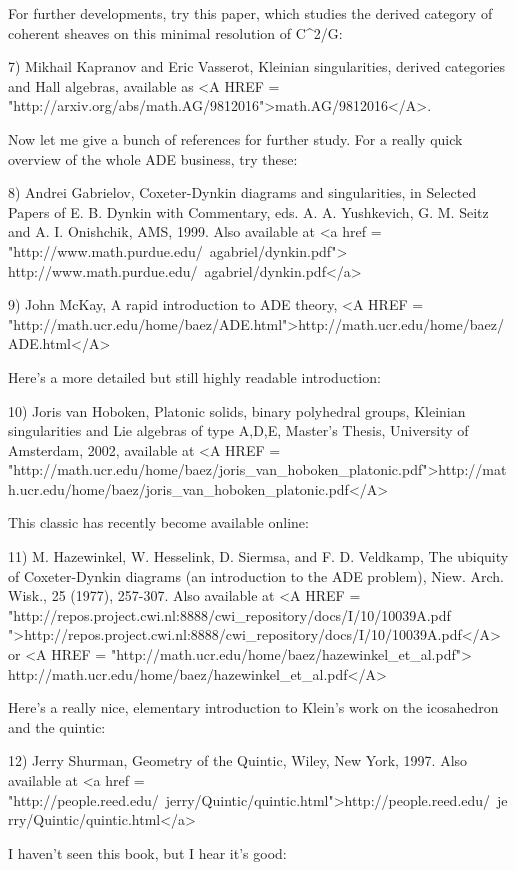 For further developments, try this paper, which studies the derived 
category of coherent sheaves on this minimal resolution of C^{2}/G:

7) Mikhail Kapranov and Eric Vasserot, Kleinian singularities,
derived categories and Hall algebras, available as <A HREF = 
"http://arxiv.org/abs/math.AG/9812016">math.AG/9812016</A>.

Now let me give a bunch of references for further study.  For a
really quick overview of the whole ADE business, try these:

8) Andrei Gabrielov, Coxeter-Dynkin diagrams and singularities,
in Selected Papers of E. B. Dynkin with Commentary, eds. A. A.
Yushkevich, G. M. Seitz and A. I. Onishchik, AMS, 1999.
Also available at 
<a href = "http://www.math.purdue.edu/~agabriel/dynkin.pdf">
http://www.math.purdue.edu/~agabriel/dynkin.pdf</a>

9) John McKay, A rapid introduction to ADE theory, 
<A HREF = "http://math.ucr.edu/home/baez/ADE.html">http://math.ucr.edu/home/baez/ADE.html</A>

Here's a more detailed but still highly readable introduction:

10) Joris van Hoboken, Platonic solids, binary polyhedral groups, 
Kleinian singularities and Lie algebras of type A,D,E, Master's Thesis, 
University of Amsterdam, 2002, available at 
<A HREF = "http://math.ucr.edu/home/baez/joris_van_hoboken_platonic.pdf">http://math.ucr.edu/home/baez/joris_van_hoboken_platonic.pdf</A>

This classic has recently become available online:

11) M. Hazewinkel, W. Hesselink, D. Siermsa, and F. D. Veldkamp, The 
ubiquity of Coxeter-Dynkin diagrams (an introduction to the ADE problem), 
Niew. Arch. Wisk., 25 (1977), 257-307.
Also available at
<A HREF = "http://repos.project.cwi.nl:8888/cwi_repository/docs/I/10/10039A.pdf
">http://repos.project.cwi.nl:8888/cwi_repository/docs/I/10/10039A.pdf</A>
or 
<A HREF = "http://math.ucr.edu/home/baez/hazewinkel_et_al.pdf">
http://math.ucr.edu/home/baez/hazewinkel_et_al.pdf</A>

Here's a really nice, elementary introduction to Klein's work on
the icosahedron and the quintic:

12) Jerry Shurman, Geometry of the Quintic, Wiley, New York, 1997.
Also available at <a href = "http://people.reed.edu/~jerry/Quintic/quintic.html">http://people.reed.edu/~jerry/Quintic/quintic.html</a>

I haven't seen this book, but I hear it's good:

